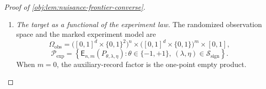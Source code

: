 \begin{proof}[Proof of \cref{obj:lem:nuisance-frontier-converse}]
\begin{enumerate}
Define the mixtures of the original data blocks by
\[
M_\theta
=\int \mathcal L_P(\mathcal D_{n,m})\,d\varpi_\theta(P),
\qquad \theta\in\{-1,+1\}.
\]
The certificate also supplies
\[
H^2(M_{+1},M_{-1})\le CnNh^d\delta^da^2b^2.
\]
To evaluate its right-hand side, first note that
\[
\delta^da^2b^2=\rho_0^4\delta^{d+2S},
\qquad
d+\frac{\gamma(d+2S)}{S}
=d+\frac{\gamma d}{S}+2\gamma=\Delta.
\]
Hence
\[
\begin{aligned}
nNh^d\delta^da^2b^2
&=\rho_0^4c_h^dc_\delta^{d+2S}
  (nN)^{\,1-d/\Delta-\gamma(d+2S)/(S\Delta)}\\
&=\rho_0^4c_h^dc_\delta^{d+2S}.
\end{aligned}
\]
The inequality \(C\rho_0^4c_h^dc_\delta^{d+2S}\le1/16\) proves
\[
H^2(M_{+1},M_{-1})
\le C\rho_0^4c_h^dc_\delta^{d+2S}
\le\frac1{16}.
\]

\item \textit{The target as a functional of the experiment law.}
The randomized observation space and the marked experiment model are
\[
\Omega_{\mathrm{obs}}
=
\bigl([0,1]^d\times\{0,1\}^2\bigr)^n
\times
\bigl([0,1]^d\times\{0,1\}\bigr)^m
\times[0,1],
\]
\[
\mathcal P_{\mathrm{exp}}
=
\left\{
\mathsf E_{n,m}(P_{\theta,\lambda,\eta}):
\theta\in\{-1,+1\},\
(\lambda,\eta)\in\mathcal S_{\mathrm{sign}}
\right\}.
\]
When \(m=0\), the auxiliary-record factor is the one-point empty product.


\end{enumerate}
\end{proof}
